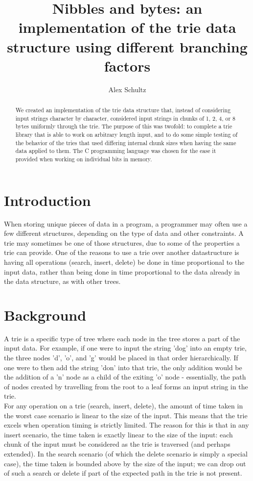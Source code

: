 \documentclass{llncs}
\title{Nibbles and bytes: an implementation of the trie data structure using different branching factors}
\author{Alex Schultz}
\institute{Tufts University}
\begin{document}
\maketitle

\begin{abstract}
We created an implementation of the trie data structure that, instead of considering input strings character by character, considered input strings in chunks of 1, 2, 4, or 8 bytes uniformly through the trie. The purpose of this was twofold: to complete a trie library that is able to work on arbitrary length input, and to do some simple testing of the behavior of the tries that used differing internal chunk sizes when having the same data applied to them. The C programming language was chosen for the ease it provided when working on individual bits in memory.
\end{abstract}

\section{Introduction}
\label{Introduction}
When storing unique pieces of data in a program, a programmer may often use a few different structures, depending on the type of data and other constraints. A trie may sometimes be one of those structures, due to some of the properties a trie can provide. One of the reasons to use a trie over another datastructure is having all operations (search, insert, delete) be done in time proportional to the input data, rather than being done in time proportional to the data already in the data structure, as with other trees.

\section{Background}
A trie is a specific type of tree where each node in the tree stores a part of the input data. For example, if one were to input the string 'dog' into an empty trie, the three nodes 'd', 'o', and 'g' would be placed in that order hierarchically. If one were to then add the string 'don' into that trie, the only addition would be the addition of a 'n' node as a child of the exiting 'o' node - essentially, the path of nodes created by travelling from the root to a leaf forms an input string in the trie. \\ %
For any operation on a trie (search, insert, delete), the amount of time taken in the worst case scenario is linear to the size of the input. This means that the trie excels when operation timing is strictly limited. The reason for this is that in any insert scenario, the time taken is exactly linear to the size of the input: each chunk of the input must be considered as the trie is traversed (and perhaps extended). In the search scenario (of which the delete scenario is simply a special case), the time taken is bounded above by the size of the input; we can drop out of such a search or delete if part of the expected path in the trie is not present. \\
\newpage
\end{document}
